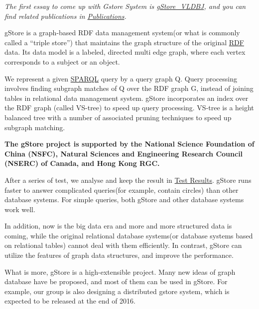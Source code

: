 \documentclass[titlepage, a4paper, 12pt]{article}
\begin{document}
\textit{The first essay to come up with Gstore System is
\href{run:../pdf/gStoreVLDBJ.pdf}{gStore\_VLDBJ}, and you can find related publications in
\hyperref[chapter08]{Publications}.}


gStore is a graph-based RDF data management system(or what is commonly called a ``triple store'') that maintains the graph structure of the original \href{http://www.w3.org/TR/rdf11-concepts/}{RDF} data. Its data model is a labeled, directed multi edge graph, where each vertex corresponds to a subject or an object.

We represent a given \href{http://www.w3.org/TR/sparql11-overview/}{SPARQL} query by a query graph Q. Query processing involves finding subgraph matches of Q over the RDF graph G, instead of joining tables in relational data management system. gStore incorporates an index over the RDF graph (called VS-tree) to speed up query processing. VS-tree is a height balanced tree with a number of associated pruning techniques to speed up subgraph matching.

\textbf{The gStore project is supported by the National Science Foundation of China (NSFC), Natural Sciences and Engineering Research Council (NSERC) of Canada, and Hong Kong RGC.}


After a series of test, we analyse and keep the result in \hyperref[chapter14]{Test Results}. gStore runs faster to answer complicated queries(for example, contain circles) than other database systems. For simple queries, both gStore and other database systems work
well.

In addition, now is the big data era and more and more structured data is coming, while the original relational database systems(or database systems based on relational tables) cannot deal with them efficiently.  In contrast, gStore can utilize the features of graph data structures, and improve the performance.

What is more, gStore is a high-extensible project. Many new ideas of graph database have be proposed, and most of them can be used in gStore.  For example, our group is also designing a distributed gstore system, which is expected to be released at the end of 2016.
\end{document}
